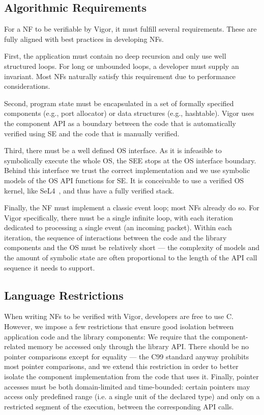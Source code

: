 \documentclass[letterpaper,twocolumn,10pt]{article}
\begin{document}
\subsection{Algorithmic Requirements}
\label{sec:algorithmic-requirements}

For a NF to be verifiable by Vigor, it must fulfill several requirements. These
are fully aligned with best practices in developing NFs.

First, the application must contain no deep recursion and only use well
structured loops. For long or unbounded loops, a developer must supply an
invariant. Most NFs naturally satisfy this requirement due to performance
considerations.

Second, program state must be encapsulated in a set of formally specified
components (e.g., port allocator) or data structures (e.g., hashtable). Vigor
uses the component API as a boundary between the code that is automatically
verified using SE and the code that is manually
verified.%

Third, there must be a well defined OS interface. As it is infeasible to
symbolically execute the whole OS, the SEE stops at the OS interface boundary.
Behind this interface we trust the correct implementation and we use symbolic
models of the OS API functions for SE. It is conceivable to use a verified OS
kernel, like SeL4~\cite{klein2009sel4}, and thus have a fully verified stack.
    
Finally, the NF must implement a classic event loop; most NFs already do so. For
Vigor specifically, there must be a single infinite loop, with each iteration
dedicated to processing a single event (an incoming packet). Within each
iteration, the sequence of interactions between the code and the library
components and the OS must be relatively short --- the complexity of models and
the amount of symbolic state are often proportional to the length of the API
call sequence it needs to support.

\subsection{Language Restrictions}
\label{sec:language-restrictions}

When writing NFs to be verified with Vigor, developers are free to use C.
However, we impose a few restrictions that ensure good isolation between
application code and the library components: We require that the
component-related memory be accessed only through the library API. There should
be no pointer comparisons except for equality --- the C99 standard anyway
prohibits most pointer comparisons, and we extend this restriction in order to
better isolate the component implementation from the code that uses it. Finally,
pointer accesses must be both domain-limited and time-bounded: certain pointers
may access only predefined range (i.e. a single unit of the declared type) and
only on a restricted segment of the execution, between the corresponding API
calls.
    
\end{document}
